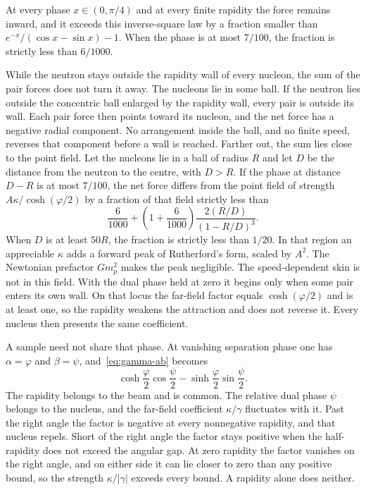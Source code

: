 \documentclass[a4paper]{article}
\begin{document}
At every phase \(x\in(0,\pi/4)\) and at every finite rapidity the force remains inward, and it exceeds this inverse-square law by a fraction smaller than \(e^{-x}/(\cos x-\sin x)-1\). When the phase is at most \(7/100\), the fraction is strictly less than \(6/1000\).

While the neutron stays outside the rapidity wall of every nucleon, the sum of the pair forces does not turn it away. The nucleons lie in some ball. If the neutron lies outside the concentric ball enlarged by the rapidity wall, every pair is outside its wall. Each pair force then points toward its nucleon, and the net force has a negative radial component. No arrangement inside the ball, and no finite speed, reverses that component before a wall is reached. Farther out, the sum lies close to the point field. Let the nucleons lie in a ball of radius \(R\) and let \(D\) be the distance from the neutron to the centre, with \(D>R\). If the phase at distance \(D-R\) is at most \(7/100\), the net force differs from the point field of strength \(A\kappa/\cosh(\varphi/2)\) by a fraction of that field strictly less than
\[
\frac{6}{1000}+\left(1+\frac{6}{1000}\right)\frac{2(R/D)}{(1-R/D)^{3}}.
\]
When \(D\) is at least \(50R\), the fraction is strictly less than \(1/20\). In that region an appreciable \(\kappa\) adds a forward peak of Rutherford's form, scaled by \(A^{2}\). The Newtonian prefactor \(Gm_p^{2}\) makes the peak negligible. The speed-dependent skin is not in this field. With the dual phase held at zero it begins only when some pair enters its own wall. On that locus the far-field factor equals \(\cosh(\varphi/2)\) and is at least one, so the rapidity weakens the attraction and does not reverse it. Every nucleus then presents the same coefficient.

A sample need not share that phase. At vanishing separation phase one has \(\alpha=\varphi\) and \(\beta=\psi\), and~\eqref{eq:gamma-ab} becomes
\[
\cosh\frac{\varphi}{2}\cos\frac{\psi}{2}-\sinh\frac{\varphi}{2}\sin\frac{\psi}{2}.
\]
The rapidity belongs to the beam and is common. The relative dual phase \(\psi\) belongs to the nucleus, and the far-field coefficient \(\kappa/\gamma\) fluctuates with it. Past the right angle the factor is negative at every nonnegative rapidity, and that nucleus repels. Short of the right angle the factor stays positive when the half-rapidity does not exceed the angular gap. At zero rapidity the factor vanishes on the right angle, and on either side it can lie closer to zero than any positive bound, so the strength \(\kappa/|\gamma|\) exceeds every bound. A rapidity alone does neither.
\end{document}
